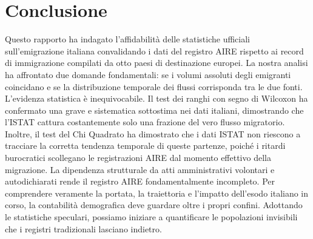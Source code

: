 \section{Conclusione}\label{sec:conclusion}

Questo rapporto ha indagato l'affidabilità delle statistiche ufficiali sull'emigrazione italiana convalidando i dati del registro AIRE rispetto ai record di immigrazione compilati da otto paesi di destinazione europei.
La nostra analisi ha affrontato due domande fondamentali: se i volumi assoluti degli emigranti coincidano e se la distribuzione temporale dei flussi corrisponda tra le due fonti.
L'evidenza statistica è inequivocabile.
Il test dei ranghi con segno di Wilcoxon ha confermato una grave e sistematica sottostima nei dati italiani, dimostrando che l'ISTAT cattura costantemente solo una frazione del vero flusso migratorio.
Inoltre, il test del Chi Quadrato ha dimostrato che i dati ISTAT non riescono a tracciare la corretta tendenza temporale di queste partenze, poiché i ritardi burocratici scollegano le registrazioni AIRE dal momento effettivo della migrazione.
La dipendenza strutturale da atti amministrativi volontari e autodichiarati rende il registro AIRE fondamentalmente incompleto.
Per comprendere veramente la portata, la traiettoria e l'impatto dell'esodo italiano in corso, la contabilità demografica deve guardare oltre i propri confini.
Adottando le statistiche speculari, possiamo iniziare a quantificare le popolazioni invisibili che i registri tradizionali lasciano indietro.

